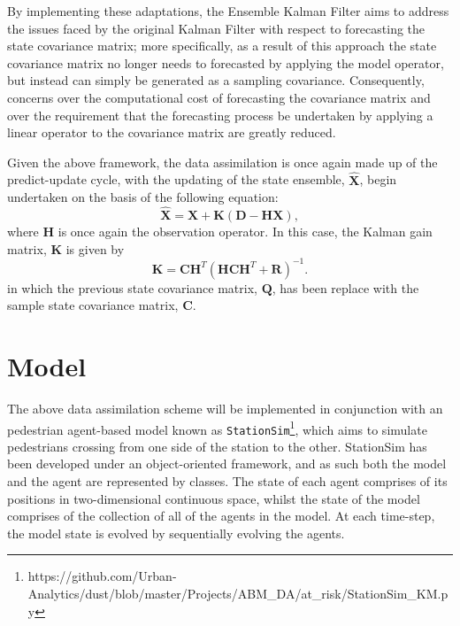 By implementing these adaptations, the Ensemble Kalman Filter aims to address
the issues faced by the original Kalman Filter with respect to forecasting the
state covariance matrix; more specifically, as a result of this approach the
state covariance matrix no longer needs to forecasted by applying the model
operator, but instead can simply be generated as a sampling covariance.
Consequently, concerns over the computational cost of forecasting the covariance
matrix and over the requirement that the forecasting process be undertaken by
applying a linear operator to the covariance matrix are greatly reduced.

Given the above framework, the data assimilation is once again made up of the
predict-update cycle, with the updating of the state ensemble,
$\hat{\mathbf{X}}$, begin undertaken on the basis of the following equation: 
\begin{equation}
    \hat{\mathbf{X}} = \mathbf{X} + \mathbf{K}
                        \left(
                        \mathbf{D} - \mathbf{H} \mathbf{X}
                        \right),
\end{equation}
where $\mathbf{H}$ is once again the observation operator. 
In this case, the Kalman gain matrix, $\mathbf{K}$ is given by
\begin{equation}
    \mathbf{K} = \mathbf{C} \mathbf{H}^T
                     {\left(
                     \mathbf{H} \mathbf{C} \mathbf{H}^T
                     + \mathbf{R}
                     \right)} ^ {-1}.
\end{equation}
in which the previous state covariance matrix, $\mathbf{Q}$, has been replace
with the sample state covariance matrix, $\mathbf{C}$.

\section{Model}\label{sec:method:model}

The above data assimilation scheme will be implemented in conjunction with an
pedestrian agent-based model known as
\texttt{StationSim}\footnote{https://github.com/Urban-Analytics/dust/blob/master/Projects/ABM\_DA/at\_risk/StationSim\_KM.py},
which aims to simulate pedestrians crossing from one side of the station to the
other.
StationSim has been developed under an object-oriented framework, and as such
both the model and the agent are represented by classes.
The state of each agent comprises of its positions in two-dimensional continuous
space, whilst the state of the model comprises of the collection of all of the
agents in the model.
At each time-step, the model state is evolved by sequentially evolving the
agents.

